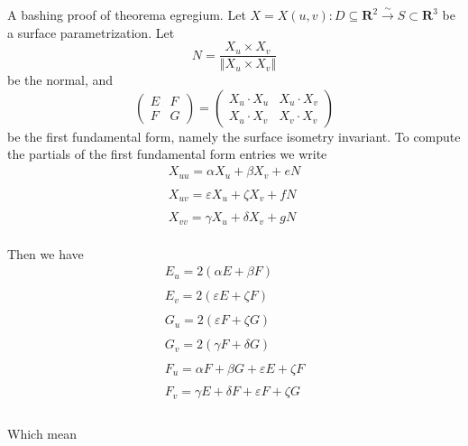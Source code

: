 \documentclass[english]{article}
\newcommand\norm[1]{\left\Vert {#1}\right\Vert }
\renewcommand\to{\longrightarrow}
\def\eps{\varepsilon}
\def\sub{\subseteq}
\def\subn{\subset}
\def\R{\mathbf{R}}
\begin{document}
A bashing proof of theorema egregium. Let $X=X(u,v):D\sub\R^2\overset{\sim}{\to}S\subn \R^3$ be a surface parametrization. Let $$N=\dfrac{X_u\times X_v}{\norm{X_u\times X_v}}$$ be the normal, and
$$\left(\begin{array}{cc}
E & F\\
F & G
\end{array}\right)=\left(\begin{array}{cc}
X_{u}\cdot X_{u} & X_{u}\cdot X_{v}\\
X_{u}\cdot X_{v} & X_{v}\cdot X_{v}
\end{array}\right)$$ be the first fundamental form, namely the surface isometry invariant. To compute the partials of the first fundamental form entries we write
$$\begin{array}{ccc}
X_{uu} =\alpha X_{u} + \beta X_{v} + eN\\\\
X_{uv} = \eps X_{u} + \zeta X_{v} + fN\\\\
X_{vv} = \gamma X_{u} + \delta X_{v} + gN
\end{array}$$\\
Then we have
$$
\begin{array}{c}
E_{u} = 2(\alpha E+\beta F)\\\\
E_{v} = 2(\eps E+\zeta F)\\\\
G_{u} = 2(\eps F+\zeta G)\\\\
G_{v}  =  2(\gamma F+\delta G)\\\\
F_u=\alpha F + \beta G + \eps E  + \zeta F\\\\
F_v = \gamma E + \delta F + \eps F + \zeta G\\
\end{array}
$$\\
Which mean
\end{document}
